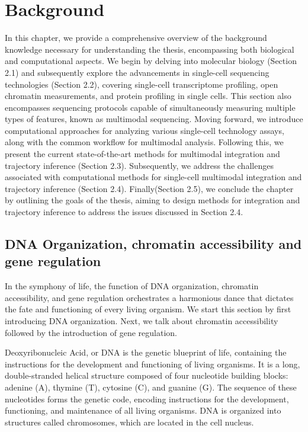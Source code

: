 \chapter{Background}
\label{cha:background}
\graphicspath{{chapter2/figs/}}

In this chapter, we provide a comprehensive overview of the background knowledge necessary for understanding the thesis, encompassing both biological and computational aspects. We begin by delving into molecular biology (Section 2.1) and subsequently explore the advancements in single-cell sequencing technologies (Section 2.2), covering single-cell transcriptome profiling, open chromatin measurements, and protein profiling in single cells. This section also encompasses sequencing protocols capable of simultaneously measuring multiple types of features, known as multimodal sequencing. Moving forward, we introduce computational approaches for analyzing various single-cell technology assays, along with the common workflow for multimodal analysis. Following this, we present the current state-of-the-art methods for multimodal integration and trajectory inference (Section 2.3). Subsequently, we address the challenges associated with computational methods for single-cell multimodal integration and trajectory inference (Section 2.4). Finally(Section 2.5), we conclude the chapter by outlining the goals of the thesis, aiming to design methods for integration and trajectory inference to address the issues discussed in Section 2.4.


\section{DNA Organization, chromatin accessibility and gene regulation}
\label{background:DNA_Chromatin_Regulation}
In the symphony of life, the function of DNA organization, chromatin accessibility, and gene regulation orchestrates a harmonious dance that dictates the fate and functioning of every living organism. We start this section by first introducing DNA organization. Next, we talk about chromatin accessibility followed by the introduction of gene regulation.

Deoxyribonucleic Acid, or DNA is the genetic blueprint of life, containing the instructions for the development and functioning of living organisms. It is a long, double-stranded helical structure composed of four nucleotide building blocks: adenine (A), thymine (T), cytosine (C), and guanine (G). The sequence of these nucleotides forms the genetic code, encoding instructions for the development, functioning, and maintenance of all living organisms. DNA is organized into structures called chromosomes, which are located in the cell nucleus.


